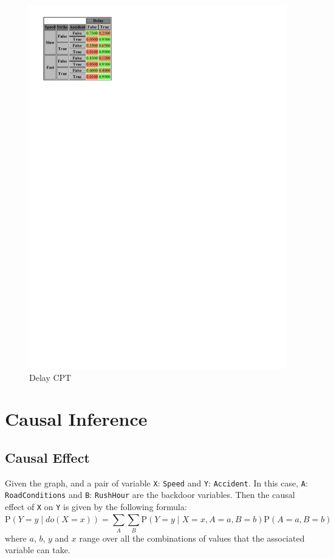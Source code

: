 \documentclass[a4paper,12pt]{article} %
\begin{document}
\begin{figure}[H]
\begin{center}
\begin{minipage}[c]{.45\textwidth}
		\includegraphics[width=.9\linewidth]{../code/delay.pdf}	
		\caption*{Delay CPT}
		\label{fig:delay}
	\end{minipage}

\end{center}
\end{figure}

\section{Causal Inference}

\subsection*{Causal Effect}
Given the graph, and a pair of variable \texttt{X}: \texttt{Speed} and \texttt{Y}: \texttt{Accident}. In this case, \texttt{A}: \texttt{RoadConditions} and \texttt{B}: \texttt{RushHour} are the backdoor variables. Then the causal effect of \texttt{X} on \texttt{Y} is given by the following formula:
\begin{equation}
	\text{P}(Y = y \mid {do}(X = x)) = \sum_{A}^{}\sum_{B}^{}	\text{P}(Y = y \mid X = x, A = a, B = b)\text{P}(A = a, B = b)
\end{equation}
where $a$, $b$, $y$ and $x$ range over all the combinations of values that the associated variable can take.\\
\end{document}
